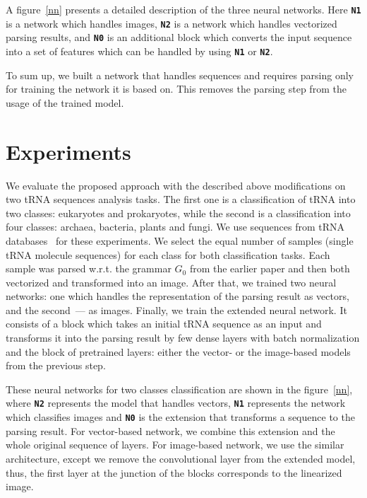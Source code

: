 \documentclass[12pt,a4paper]{cibb}
\begin{document}
A figure~\ref{nn} presents a detailed description of the three neural networks.
Here \textbf{\texttt{N1}} is a network which handles images, \textbf{\texttt{N2}} is a network which handles vectorized parsing results, and \textbf{\texttt{N0}} is an additional block which converts the input sequence into a set of features which can be handled by using \textbf{\texttt{N1}} or \textbf{\texttt{N2}}.

To sum up, we built a network that handles sequences and requires parsing only for training the network it is based on.
This removes the parsing step from the usage of the trained model.


\section{\bf Experiments}

We evaluate the proposed approach with the described above modifications on two tRNA sequences analysis tasks.
The first one is a classification of tRNA into two classes: eukaryotes and prokaryotes, while the second is a classification into four classes: archaea, bacteria, plants and fungi.
We use sequences from tRNA databases~\cite{trnadb1,trnadb2} for these experiments.
We select the equal number of samples (single tRNA molecule sequences) for each class for both classification tasks.
Each sample was parsed w.r.t. the grammar $G_0$ from the earlier paper and then both vectorized and transformed into an image.
After that, we trained two neural networks: one which handles the representation of the parsing result as vectors, and the second~--- as images.
Finally, we train the extended neural network.
It consists of a block which takes an initial tRNA sequence as an input and transforms it into the parsing result by few dense layers with batch normalization and the block of pretrained layers: either the vector- or the image-based models from the previous step.

These neural networks for two classes classification are shown in the figure~\ref{nn}, where \textbf{\texttt{N2}} represents the model that handles vectors, \textbf{\texttt{N1}} represents the network which classifies images and \textbf{\texttt{N0}} is the extension that transforms a sequence to the parsing result.
For vector-based network, we combine this extension and the whole original sequence of layers.
For image-based network, we use the similar architecture, except we remove the convolutional layer from the extended model, thus, the first layer at the junction of the blocks corresponds to the linearized image.
\end{document}
